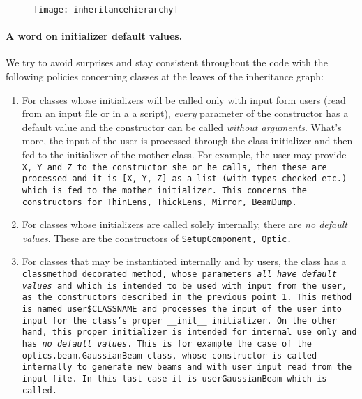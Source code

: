 \documentclass{article}
\begin{document}
\begin{figure}[h]
\begin{center}
\texttt{[image: inheritancehierarchy]}
\label{inheritancehierarchy}
\end{center}
\end{figure}
\paragraph{A word on initializer default values.}We try to avoid surprises and stay consistent throughout the code with the following policies concerning classes at the leaves of the inheritance graph:

\begin{enumerate}
\item For classes whose initializers will be called only with input form users (read from an input file or in a a script), \textit{every} parameter of the constructor has a default value and the constructor can be called \textit{without arguments}. What's more, the input of the user is processed through the class initializer and then fed to the initializer of the mother class. For example, the user may provide \tt{X}, \tt{Y} and \tt{Z} to the constructor she or he calls, then these are processed and it is \tt{[X, Y, Z]} as a list (with types checked etc.) which is fed to the mother initializer. This concerns the constructors for \tt{ThinLens}, \tt{ThickLens}, \tt{Mirror}, \tt{BeamDump}.

\item For classes whose initializers are called solely internally, there are \textit{no default values}. These are the constructors of \tt{SetupComponent}, \tt{Optic}.

\item For classes that may be instantiated internally and by users, the class has a \tt{classmethod} decorated method, whose parameters \textit{all have default values} and which is intended to be used with input from the user, as the constructors described in the previous point 1. This method is named \tt{user\$CLASSNAME} and processes the input of the user into input for the class's proper \tt{\_\_init\_\_} initializer. On the other hand, this proper initializer is intended for internal use only and has \textit{no default values}. This is for example the case of the \tt{optics.beam.GaussianBeam} class, whose constructor is called internally to generate new beams and with user input read from the input file. In this last case it is \tt{userGaussianBeam} which is called.
\end{enumerate}
\end{document}
